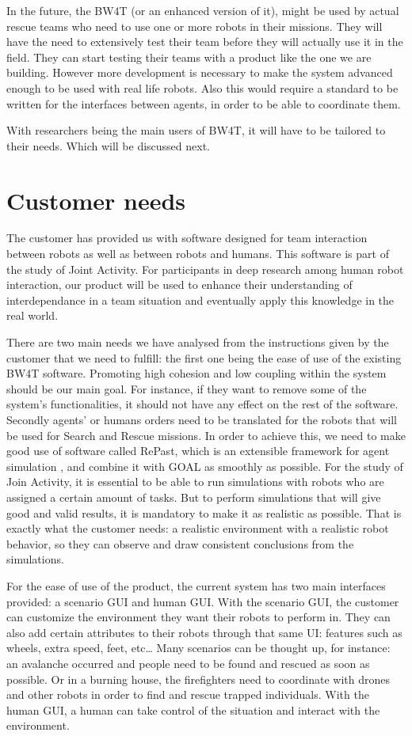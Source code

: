 \documentclass[oneside]{tudelft-report}
\begin{document}
In the future, the BW4T (or an enhanced version of it), might be used by actual rescue teams who need to use one or more robots in their missions. They will have the need to extensively test their team before they will actually use it in the field. They can start testing their teams with a product like the one we are building. However more development is necessary to make the system advanced enough to be used with real life robots. Also this would require a standard to be written for the interfaces between agents, in order to be able to coordinate them. 

With researchers being the main users of BW4T, it will have to be tailored to their needs. Which will be discussed next.

\chapter{Customer needs}
The customer has provided us with software designed for team interaction between robots as well as between robots and humans. This software is part of the study of Joint Activity. For participants in deep research among human robot interaction, our product will be used to enhance their understanding of interdependance in a team situation and eventually apply this knowledge in the real world.

There are two main needs we have analysed from the instructions given by the customer \cite{context} that we need to fulfill: the first one being the ease of use of the existing BW4T software. Promoting high cohesion and low coupling within the system should be our main goal. For instance, if they want to remove some of the system's functionalities, it should not have any effect on the rest of the software. Secondly agents’ or humans orders need to be translated for the robots that will be used for Search and Rescue missions. In order to achieve this, we need to make good use of software called RePast, which is an extensible framework for agent simulation \cite{repast}, and combine it with GOAL as smoothly as possible. For the study of Join Activity, it is essential to be able to run simulations with robots who are assigned a certain amount of tasks. But to perform simulations that will give good and valid results, it is mandatory to make it as realistic as possible. That is exactly what the customer needs: a realistic environment with a realistic robot behavior, so they can observe and draw consistent conclusions from the simulations.

For the ease of use of the product, the current system has two main interfaces provided: a scenario GUI and human GUI. With the scenario GUI, the customer can customize the environment they want their robots to perform in. They can also add certain attributes to their robots through that same UI: features such as wheels, extra speed, feet, etc… Many scenarios can be thought up, for instance: an avalanche occurred and people need to be found and rescued as soon as possible. Or in a burning house, the firefighters need to coordinate with drones and other robots in order to find and rescue trapped individuals. With the human GUI, a human can take control of the situation and interact with the environment. 
\end{document}
